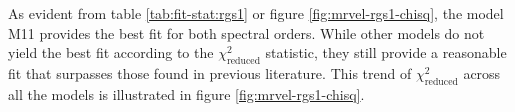 			As evident from table \ref{tab:fit-stat:rgs1} or figure \ref{fig:mrvel-rgs1-chisq}, the model M11 provides the best fit for both spectral orders.
			While other models do not yield the best fit according to the $\chi^2_\text{reduced}$ statistic, they still provide a reasonable fit that surpasses those found in previous literature. This trend of $\chi^2_\text{reduced}$ across all the models is illustrated in figure \ref{fig:mrvel-rgs1-chisq}.
			
